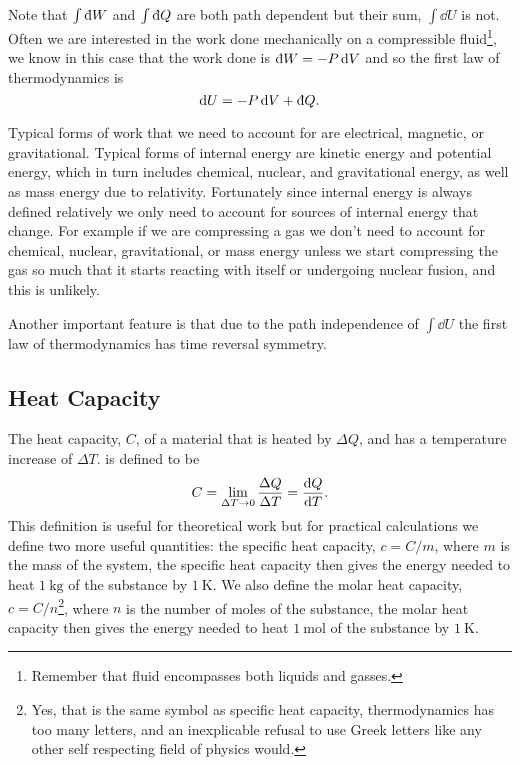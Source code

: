 \documentclass[a4paper]{article}
\newcommand{\ddbar}[1]{\text{\dj}{#1}}
\begin{document}
    Note that \(\int\ddbar{W}\) and \(\int\ddbar{Q}\) are both path dependent but their sum, \(\int\dd{U}\) is not.
    Often we are interested in the work done mechanically on a compressible fluid\footnote{Remember that fluid encompasses both liquids and gasses.}, we know in this case that the work done is \(\ddbar{W} = -P\dd{V}\) and so the first law of thermodynamics is
    \[\dd{U} = -P\dd{V} + \ddbar{Q}.\]
    
    Typical forms of work that we need to account for are electrical, magnetic, or gravitational.
    Typical forms of internal energy are kinetic energy and potential energy, which in turn includes chemical, nuclear, and gravitational energy, as well as mass energy due to relativity.
    Fortunately since internal energy is always defined relatively we only need to account for sources of internal energy that change.
    For example if we are compressing a gas we don't need to account for chemical, nuclear, gravitational, or mass energy unless we start compressing the gas so much that it starts reacting with itself or undergoing nuclear fusion, and this is unlikely.
    
    Another important feature is that due to the path independence of \(\int\dd{U}\) the first law of thermodynamics has time reversal symmetry.
    
    \subsection{Heat Capacity}
    The heat capacity, \(C\), of a material that is heated by \(\Delta Q\), and has a temperature increase of \(\Delta T\). is defined to be
    \[C = \lim_{\Delta T\to 0} \frac{\Delta Q}{\Delta T} = \dv{Q}{T}.\]
    This definition is useful for theoretical work but for practical calculations we define two more useful quantities: the specific heat capacity, \(c = C/m\),  where \(m\) is the mass of the system, the specific heat capacity then gives the energy needed to heat \(\SI{1}{\kilogram}\) of the substance by \(\SI{1}{\kelvin}\).
    We also define the molar heat capacity, \(c = C/n\)\footnote{Yes, that is the same symbol as specific heat capacity, thermodynamics has too many letters, and an inexplicable refusal to use Greek letters like any other self respecting field of physics would.}, where \(n\) is the number of moles of the substance, the molar heat capacity then gives the energy needed to heat \(\SI{1}{\mole}\) of the substance by \(\SI{1}{\kelvin}\).
    
\end{document}
